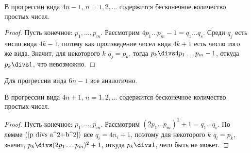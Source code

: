 \begin{stm}
  В прогрессии вида $4n - 1,\,n = 1,2,\dots$ содержится бесконечное количество 
	простых чисел.
\end{stm}

\begin{proof}
  Пусть конечное: $p_1,\ldots,p_m$. Рассмотрим $4p_1\dots p_m - 1 = q_1\dots q_s$. 
	Среди $q_j$ есть число вида $4k - 1$, потому как произведение чисел вида 
	$4k + 1$ есть число того же вида. Значит, для некоторого $k$ $q_j=p_k$, тогда
	$p_k \divs 4p_1\dots p_m-1$, откуда $p_k\divs 1$, что невозможно.
\end{proof}

\begin{note}
  Для прогрессии вида $6n - 1$ все аналогично.
\end{note}

\begin{stm}
 В прогрессии вида $4n + 1,\,n = 1,2,\dots$ содержится бесконечное количество 
	простых чисел.
\end{stm}

\begin{proof}
  Пусть конечное: $p_1,\dots,p_m$. Рассмотрим 
	$(2p_1\dots p_m)^2 + 1 = q_1\ldots q_s$. По лемме $(\ref{p divs a^2+b^2})$
	все $q_i=4n_i+1$, поэтому для	некоторого $k$ $q_l=p_k$, значит, 
	$p_k\divs(2p_1\dots p_m)^2 + 1$, откуда	$p_k\divs 1$, чего быть не может.
\end{proof}
